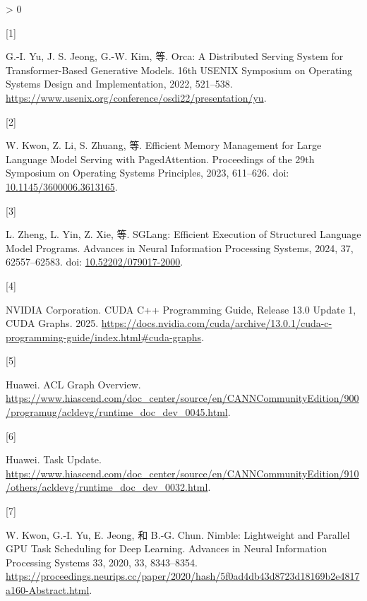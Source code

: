 \documentclass[
  UTF8,
  zihao=5]{ctexart}
\newlength{\cslhangindent}
\newlength{\csllabelwidth}
\newenvironment{CSLReferences}[2] %
 {%
  \setlength{\parindent}{0pt}
  \ifodd #1 \everypar{\setlength{\hangindent}{\cslhangindent}}\ignorespaces\fi
  \ifnum #2 > 0
  \setlength{\parskip}{#2\baselineskip}
  \fi
 }%
 {}
\newcommand{\CSLLeftMargin}[1]{\parbox[t]{\csllabelwidth}{#1}}
\newcommand{\CSLRightInline}[1]{\parbox[t]{\linewidth - \csllabelwidth}{#1}\par}
\begin{document}
\hypertarget{refs}{}
\begin{CSLReferences}{0}{0}
\leavevmode{}%
\CSLLeftMargin{{[}1{]} }%
\CSLRightInline{G.-I. Yu, J. S. Jeong, G.-W. Kim, 等. {Orca: A
Distributed Serving System for Transformer-Based Generative Models}.
16th USENIX Symposium on Operating Systems Design and Implementation,
2022, 521--538.
\url{https://www.usenix.org/conference/osdi22/presentation/yu}.}

\leavevmode{}%
\CSLLeftMargin{{[}2{]} }%
\CSLRightInline{W. Kwon, Z. Li, S. Zhuang, 等. {Efficient Memory
Management for Large Language Model Serving with PagedAttention}.
Proceedings of the 29th Symposium on Operating Systems Principles, 2023,
611--626. doi:
\href{https://doi.org/10.1145/3600006.3613165}{10.1145/3600006.3613165}.}

\leavevmode{}%
\CSLLeftMargin{{[}3{]} }%
\CSLRightInline{L. Zheng, L. Yin, Z. Xie, 等. {SGLang: Efficient
Execution of Structured Language Model Programs}. Advances in Neural
Information Processing Systems, 2024, 37, 62557--62583. doi:
\href{https://doi.org/10.52202/079017-2000}{10.52202/079017-2000}.}

\leavevmode{}%
\CSLLeftMargin{{[}4{]} }%
\CSLRightInline{NVIDIA Corporation. CUDA C++ Programming Guide, Release
13.0 Update 1, CUDA Graphs. 2025.
\url{https://docs.nvidia.com/cuda/archive/13.0.1/cuda-c-programming-guide/index.html\#cuda-graphs}.}

\leavevmode{}%
\CSLLeftMargin{{[}5{]} }%
\CSLRightInline{Huawei. {ACL Graph Overview}.
\url{https://www.hiascend.com/doc_center/source/en/CANNCommunityEdition/900/programug/acldevg/runtime_doc_dev_0045.html}.}

\leavevmode{}%
\CSLLeftMargin{{[}6{]} }%
\CSLRightInline{Huawei. {Task Update}.
\url{https://www.hiascend.com/doc_center/source/en/CANNCommunityEdition/910/others/acldevg/runtime_doc_dev_0032.html}.}

\leavevmode{}%
\CSLLeftMargin{{[}7{]} }%
\CSLRightInline{W. Kwon, G.-I. Yu, E. Jeong, 和 B.-G. Chun. Nimble:
Lightweight and Parallel GPU Task Scheduling for Deep Learning. Advances
in Neural Information Processing Systems 33, 2020, 33, 8343--8354.
\url{https://proceedings.neurips.cc/paper/2020/hash/5f0ad4db43d8723d18169b2e4817a160-Abstract.html}.}


\end{CSLReferences}
\end{document}

